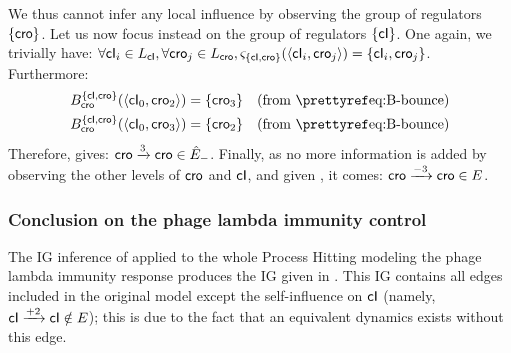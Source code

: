 We thus cannot infer any local influence by observing the group of regulators $\{ \mathsf{cro} \}$.
Let us now focus instead on the group of regulators $\{ \mathsf{cI} \}$.
One again, we trivially have:
$\forall \mathsf{cI}_i \in L_{\mathsf{cI}}, \forall \mathsf{cro}_j \in L_{\mathsf{cro}},
  \varsigma_{\{ \mathsf{cI}, \mathsf{cro} \}}(\mbox{$\langle \mathsf{cI}_i, \mathsf{cro}_j \rangle$}) = \{ \mathsf{cI}_i, \mathsf{cro}_j \}$.
Furthermore:
\begin{align*}
  \irB_{\cro}^{\{ \cI, \cro \}}(\PHetat{\cI_0, \cro_2}) &= \{ \cro_3 \} &&
    \text{(from \pref{eq:B-bounce})} \\
  \irB_{\cro}^{\{ \cI, \cro \}}(\PHetat{\cI_0, \cro_3}) &= \{ \cro_2 \} &&
    \text{(from \pref{eq:B-bounce})}
\end{align*}
Therefore,  gives: $\mathsf{cro} \xrightarrow{3} \mathsf{cro} \in \hat{E}_-$.
Finally, as no more information is added by observing the other levels of $\mathsf{cro}$ and $\mathsf{cI}$,
and given , it comes: $\mathsf{cro} \xrightarrow{- 3} \mathsf{cro} \in E$.



\subsubsection{Conclusion on the phage lambda immunity control}

The IG inference of  applied to the whole Process Hitting modeling
the phage lambda immunity response produces the IG given in .
This IG contains all edges included in the original model except the
self-influence on $\mathsf{cI}$ (namely, $\mathsf{cI} \xrightarrow{+ 2} \mathsf{cI} \notin E$);
this is due to the fact that an equivalent dynamics exists without this edge.

